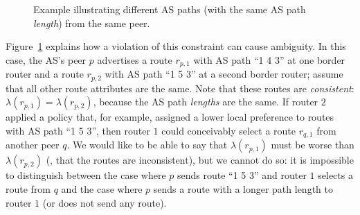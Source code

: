 \begin{figure}
\begin{center}
\begin{psfrags}
\end{psfrags}
\end{center}
\caption{Example illustrating different AS paths (with the same AS path
  {\em length}) from the same peer.}
\label{fig:ambig}
\end{figure}


Figure~\ref{fig:ambig} explains how a violation of this constraint can
cause ambiguity.  In this case, the AS's peer $p$ advertises a route
$r_{p,1}$ with AS path ``1 4 3'' at one border router and a route
$r_{p,2}$ with AS path ``1 5 3'' at a second border router; assume that
all other route attributes are the same.  Note that these routes are
{\em consistent}: $\lambda(r_{p,1})=\lambda(r_{p,2})$, because the AS
path {\em lengths} are the same.  If router $2$ applied a policy that,
for example, assigned a lower local preference to routes with AS path
``1 5 3'', then router $1$ could conceivably select a route $r_{q,1}$ from
another peer $q$.
We would like to be able to say that $\lambda(r_{p,1})$ must be worse
than $\lambda(r_{p,2})$ (\ie, that the routes are inconsistent), but we
cannot do so: it is impossible to distinguish between the case where
$p$ sends route ``1 5 3'' and router $1$ selects a route from $q$ and
the case where $p$ sends a route with a longer path length to router $1$
(or does not send any route).

